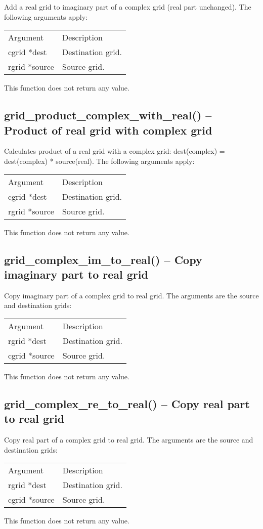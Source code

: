 \documentclass[12pt,letterpaper]{report}
\begin{document}
Add a real grid to imaginary part of a complex grid (real part unchanged). The following arguments apply:
\begin{longtable}{p{} p{}}
Argument & Description\\
\cline{1-2}
cgrid *dest & Destination grid.\\
rgrid *source & Source grid.\\
\end{longtable}
\noindent
This function does not return any value.

\subsection{grid\_product\_complex\_with\_real() -- Product of real grid with complex grid}

Calculates product of a real grid with a complex grid: dest(complex) = dest(complex) * source(real). The following arguments apply:
\begin{longtable}{p{} p{}}
Argument & Description\\
\cline{1-2}
cgrid *dest & Destination grid.\\
rgrid *source & Source grid.\\
\end{longtable}
\noindent
This function does not return any value.

\subsection{grid\_complex\_im\_to\_real() -- Copy imaginary part to real grid}

Copy imaginary part of a complex grid to real grid. The arguments are the source and destination grids:
\begin{longtable}{p{} p{}}
Argument & Description\\
\cline{1-2}
rgrid *dest & Destination grid.\\
cgrid *source & Source grid.\\
\end{longtable}
\noindent
This function does not return any value.

\subsection{grid\_complex\_re\_to\_real() -- Copy real part to real grid}

Copy real part of a complex grid to real grid. The arguments are the source and destination grids:
\begin{longtable}{p{} p{}}
Argument & Description\\
\cline{1-2}
rgrid *dest & Destination grid.\\
cgrid *source & Source grid.\\
\end{longtable}
\noindent
This function does not return any value.
\end{document}
